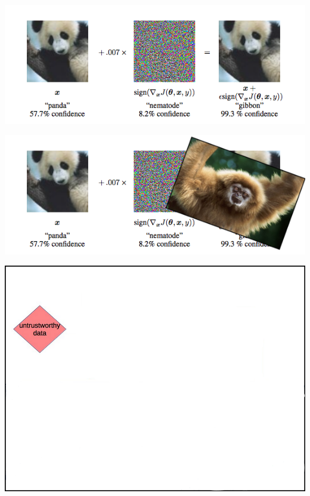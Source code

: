 \documentclass[aspectratio=169,x11names]{beamer}
\begin{document}
\begin{frame}
\begin{center}
\includegraphics[width=\textwidth,keepaspectratio]{images/recog_panda.png} 
\end{center}
\end{frame}

\begin{frame}
\begin{center}
\includegraphics[width=\textwidth, keepaspectratio]{images/recog_gibbon.png} 
\end{center}
\end{frame}


\begin{frame}
\begin{center}
\includegraphics[height=0.65\textheight,keepaspectratio]{images/deep_neural_networks_1.png}
\end{center}
\end{frame}
\end{document}

